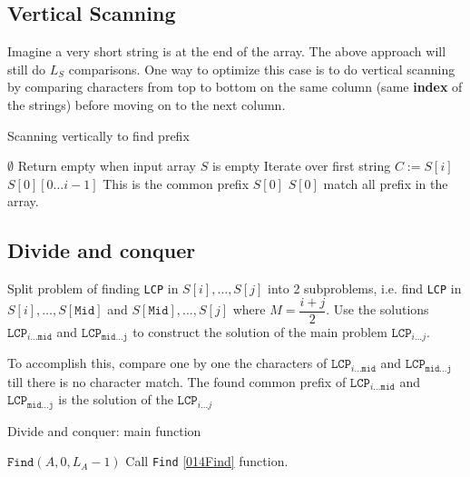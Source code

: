 \documentclass[a4paper,12pt]{article}
\begin{document}
\subsection{Vertical Scanning}
Imagine a very short string is at the end of the array. The above approach will still do $L_{S}$ comparisons. One way to optimize this case is to do vertical scanning by comparing characters from top to bottom on the same column (same \textbf{\color{red}index} of the strings) before moving on to the next column.
\begin{algorithm}[H]
\caption{Scanning vertically to find prefix}
\begin{algorithmic}[1]
\Statex
{}
\State \Return $\emptyset$ \Comment Return empty when input array $S$ is empty
\EndIf
{} \Comment Iterate over first string
\State $C := S[i]$ 
\State \Return $S[0][0\ldots i-1]$ \Comment This is the common prefix
\EndIf
\EndFor
\EndFor
\State \Return $S[0]$ \Comment $S[0]$ match all prefix in the array.
\EndProcedure
\Statex
\end{algorithmic}
\end{algorithm}

\subsection{Divide and conquer}
Split problem of finding \texttt{LCP} in $S[i], \ldots, S[j]$ into 2 subproblems, i.e. find \texttt{LCP} in $S[i], \ldots, S[\mathtt{Mid}]$ and $S[\mathtt{Mid}], \ldots, S[j]$ where $M = \dfrac{i+j}{2}$.  Use the solutions $\mathtt{LCP}_{i\ldots \mathtt{mid}}$ and $\mathtt{LCP}_{\mathtt{mid}\ldots \mathtt{j}}$ to construct the solution of the main problem $\mathtt{LCP}_{i\ldots j}$.
\par
To accomplish this, compare one by one the characters of $\mathtt{LCP}_{i\ldots \mathtt{mid}}$ and $\mathtt{LCP}_{\mathtt{mid}\ldots \mathtt{j}}$ till there is no character match. The found common prefix of $\mathtt{LCP}_{i\ldots \mathtt{mid}}$ and $\mathtt{LCP}_{\mathtt{mid}\ldots \mathtt{j}}$ is the solution of the  $\mathtt{LCP}_{i\ldots j}$
\begin{algorithm}[H]
\caption{Divide and conquer: main function}
\begin{algorithmic}[1]
\Statex
{}
\State \Return $\mathtt{Find}(A, 0, L_{A}-1)$ \Comment Call \texttt{Find} \ref{014Find} function.
\EndProcedure
\Statex
\end{algorithmic}
\end{algorithm}
\end{document}
